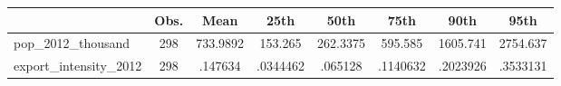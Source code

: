 {
\def\sym#1{\ifmmode^{#1}\else\(^{#1}\)\fi}
\begin{tabular}{l*{1}{ccccccc}}
\toprule
                    &        Obs.&        Mean&        25th&        50th&        75th&        90th&        95th\\
\midrule
pop\_2012\_thousand   &         298&    733.9892&     153.265&    262.3375&     595.585&    1605.741&    2754.637\\
export\_intensity\_2012&         298&     .147634&    .0344462&     .065128&    .1140632&    .2023926&    .3533131\\
\bottomrule
\end{tabular}
}
